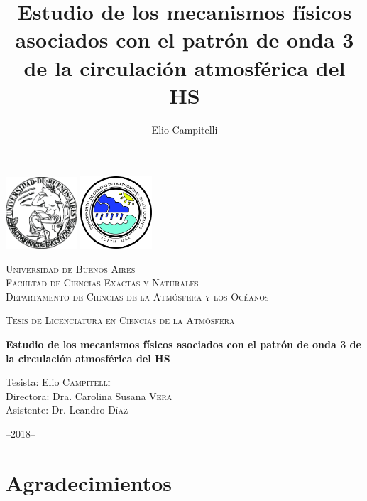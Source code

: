 \documentclass[spanish,a4paper,12pt,oneside]{book}
\title{Estudio de los mecanismos físicos asociados con el patrón de onda 3 de
la circulación atmosférica del HS}
\author{Elio Campitelli}
\date{}
\begin{document}
\maketitle

\frontmatter

\begin{titlepage}
    \centering
    \includegraphics[width=0.2\textwidth]{logoUBA}  \hfill \includegraphics[width=0.2\textwidth]{logoDCAO} \par
    \vspace{0.5cm}
    {\scshape\LARGE Universidad de Buenos Aires  \\
    \large Facultad de Ciencias Exactas y Naturales \\
Departamento de Ciencias de la Atmósfera y los Océanos  \par}
    \vspace{0.5cm}
    {\scshape\Large Tesis de Licenciatura en Ciencias de la Atmósfera\par}
    \vspace{1cm}
    {\huge\bfseries Estudio de los mecanismos físicos asociados con el patrón de onda 3 de la circulación atmosférica del HS\par}
    \vspace{1.5cm}
    {\Large Tesista: Elio \textsc{Campitelli} \\
        Directora:  Dra. Carolina Susana \textsc{Vera} \\
        Asistente: Dr. Leandro \textsc{Díaz}
    \par}
    \vfill

    {\large --2018--\par}
\end{titlepage}

\chapter*{Agradecimientos}
\end{document}
